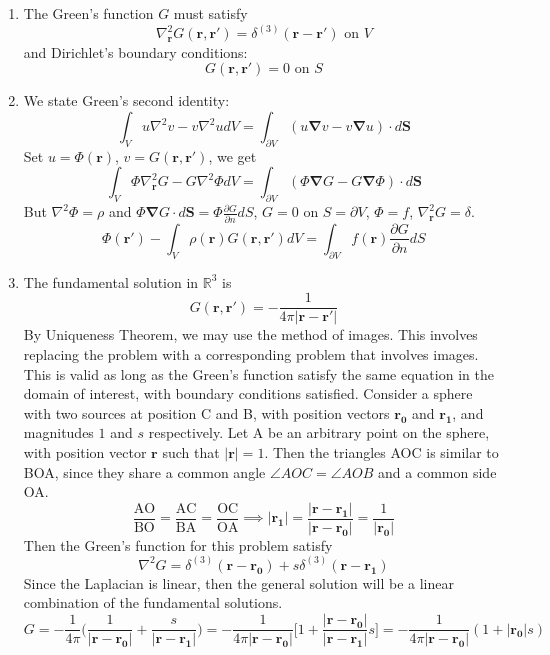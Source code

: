 \documentclass[a4paper]{article}
\begin{document}
\begin{ans}\leavevmode
\begin{enumerate}[label=(\alph*)]
\item The Green's function $G$ must satisfy
$$\nabla_{\mathbf{r}}^2G(\mathbf{r},\mathbf{r'})=\delta^{(3)}(\mathbf{r}-\mathbf{r'})\text{ on }V$$
and Dirichlet's boundary conditions:
$$G(\mathbf{r},\mathbf{r'})=0\text{ on }S$$
\item We state Green's second identity:
$$\int_Vu\nabla^2v-v\nabla^2udV=\int_{\partial V}(u\boldsymbol{\nabla}v-v\boldsymbol{\nabla}u)\cdot d\mathbf{S}$$
Set $u=\Phi(\mathbf{r})$, $v=G(\mathbf{r},\mathbf{r'})$, we get
$$\int_V\Phi\nabla_{\mathbf{r}}^2G-G\nabla^2\Phi dV=\int_{\partial V}(\Phi\boldsymbol{\nabla}G-G\boldsymbol{\nabla}\Phi)\cdot d\mathbf{S}$$
But $\nabla^2\Phi=\rho$ and $\Phi\boldsymbol{\nabla}G\cdot d\mathbf{S}=\Phi\frac{\partial G}{\partial n}dS$, $G=0$ on $S=\partial V$, $\Phi=f$, $\nabla_{\mathbf{r}}^2G=\delta$.
$$\Phi(\mathbf{r'})-\int_V\rho(\mathbf{r})G(\mathbf{r},\mathbf{r'})dV=\int_{\partial V}f(\mathbf{r})\frac{\partial G}{\partial n}dS$$
\item The fundamental solution in $\mathbb{R}^3$ is $$G(\mathbf{r},\mathbf{r'})=-\frac{1}{4\pi|\mathbf{r}-\mathbf{r'}|}$$
By Uniqueness Theorem, we may use the method of images. This involves replacing the problem with a corresponding problem that involves images. This is valid as long as the Green's function satisfy the same equation in the domain of interest, with boundary conditions satisfied. Consider a sphere with two sources at position C and B, with position vectors $\mathbf{r_0}$ and $\mathbf{r_1}$, and magnitudes $1$ and $s$ respectively. Let A be an arbitrary point on the sphere, with position vector $\mathbf{r}$ such that $|\mathbf{r}|=1$. Then the triangles AOC is similar to BOA, since they share a common angle $\angle AOC=\angle AOB$ and a common side OA.
$$\frac{\text{AO}}{\text{BO}}=\frac{\text{AC}}{\text{BA}}=\frac{\text{OC}}{\text{OA}}\implies|\mathbf{r_1}|=\frac{|\mathbf{r}-\mathbf{r_1}|}{|\mathbf{r}-\mathbf{r_0}|}=\frac{1}{|\mathbf{r_0}|}$$
Then the Green's function for this problem satisfy
$$\nabla^2G=\delta^{(3)}(\mathbf{r}-\mathbf{r_0})+s\delta^{(3)}(\mathbf{r}-\mathbf{r_1})$$
Since the Laplacian is linear, then the general solution will be a linear combination of the fundamental solutions.
$$G=-\frac{1}{4\pi}\bigg(\frac{1}{|\mathbf{r}-\mathbf{r_0}|}+\frac{s}{|\mathbf{r}-\mathbf{r_1}|}\bigg)=-\frac{1}{4\pi|\mathbf{r}-\mathbf{r_0}|}\bigg[1+\frac{|\mathbf{r}-\mathbf{r_0}|}{|\mathbf{r}-\mathbf{r_1}|}s\bigg]=-\frac{1}{4\pi|\mathbf{r}-\mathbf{r_0}|}(1+|\mathbf{r_0}|s)$$

\end{enumerate}
\end{ans}
\end{document}
